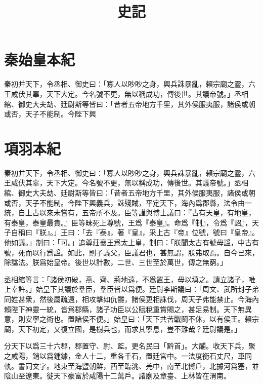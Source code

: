 \documentclass[twoside]{ltc-tw-vbook}
\title{史記}
\begin{document}
\begin{正文}
\chapter{秦始皇本紀}

秦初并天下，令丞相、御史曰：「寡人以眇眇之身，興兵誅暴亂，賴宗廟之靈，六王咸伏其辜，天下大定。今名號不更，無以稱成功，傳後世。其議帝號。」丞相綰、御史大夫劫、廷尉斯等皆曰：「昔者五帝地方千里，其外侯服夷服，諸侯或朝或否，天子不能制。今陛下興
\clearpage
\chapter{項羽本紀}

秦初并天下，令丞相、御史曰：「寡人以眇眇之身，興兵誅暴亂，賴宗廟之靈，六王咸伏其辜，天下大定。今名號不更，無以稱成功，傳後世。其議帝號。」丞相綰、御史大夫劫、廷尉斯等皆曰：「昔者五帝地方千里，其外侯服夷服，諸侯或朝或否，天子不能制。今陛下興義兵，誅殘賊，平定天下，海內爲郡縣，法令由一統，自上古以來未嘗有，五帝所不及。臣等謹與博士議曰：『古有天皇，有地皇，有泰皇，泰皇最貴。』臣等昧死上尊號，王爲『泰皇』。命爲『制』，令爲『詔』，天子自稱曰『朕』。」王曰：「去『泰』，著『皇』，采上古『帝』位號，號曰『皇帝』。他如議。」制曰：「可。」追尊莊襄王爲太上皇，制曰：「朕聞太古有號毋諡，中古有號，死而以行爲諡。如此，則子議父，臣議君也，甚無謂，朕弗取焉。自今已來，除諡法。朕爲始皇帝。後世以計數，二世、三世至於萬世，傳之無窮。」

丞相綰等言：「諸侯初破，燕、齊、荊地遠，不爲置王，毋以填之。請立諸子，唯上幸許。」始皇下其議於羣臣，羣臣皆以爲便。廷尉李斯議曰：「周文、武所封子弟同姓甚衆，然後屬疏遠，相攻擊如仇讎，諸侯更相誅伐，周天子弗能禁止。今海內賴陛下神靈一統，皆爲郡縣，諸子功臣以公賦稅重賞賜之，甚足易制。天下無異意，則安寧之術也。置諸侯不便。」始皇曰：「天下共苦戰鬬不休，以有侯王。賴宗廟，天下初定，又復立國，是樹兵也，而求其寧息，豈不難哉？廷尉議是。」

分天下以爲三十六郡，郡置守、尉、監。更名民曰「黔首」。大酺。收天下兵，聚之咸陽，銷以爲鍾鐻，金人十二，重各千石，置廷宮中。一法度衡石丈尺，車同軌。書同文字。地東至海暨朝鮮，西至臨洮、羌中，南至北嚮戶，北據河爲塞，並陰山至遼東。徙天下豪富於咸陽十二萬戶。諸廟及章臺、上林皆在渭南。
\end{正文}
\end{document}
